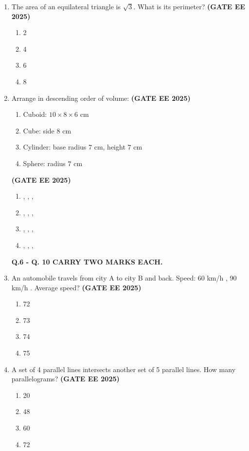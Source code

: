 \documentclass[journal,12pt,onecolumn]{IEEEtran}
\theoremstyle{remark}
\begin{document}
\begin{enumerate}
\item The area of an equilateral triangle is $\sqrt{3}$. What is its perimeter?
\hfill \textbf{(GATE EE 2025)} \begin{enumerate}
    \item 2
    \item 4
    \item 6
    \item 8
\end{enumerate}


\item Arrange in descending order of volume:
\hfill \textbf{(GATE EE 2025)} \begin{enumerate}
    \item[\brak{i}] Cuboid: $10 \times 8 \times 6$ cm
    \item[\brak{ii}] Cube: side $8$ cm
    \item[\brak{iii}] Cylinder: base radius $7$ cm, height $7$ cm
    \item[\brak{iv}] Sphere: radius $7$ cm
\end{enumerate}
\hfill \textbf{(GATE EE 2025)} \begin{enumerate}
    \item {}, , , 
    \item {}, , , 
    \item {}, , , 
    \item {}, , , 
\end{enumerate}


\textbf{Q.6 - Q. 10 CARRY TWO MARKS EACH.}


\item An automobile travels from city A to city B and back. Speed: 60 km/h , 90 km/h . Average speed?
\hfill \textbf{(GATE EE 2025)} \begin{enumerate}
    \item 72
    \item 73
    \item 74
    \item 75
\end{enumerate}

\item A set of 4 parallel lines intersects another set of 5 parallel lines. How many parallelograms?
\hfill \textbf{(GATE EE 2025)} \begin{enumerate}
    \item 20
    \item 48
    \item 60
    \item 72
\end{enumerate}



\end{enumerate}
\end{document}
